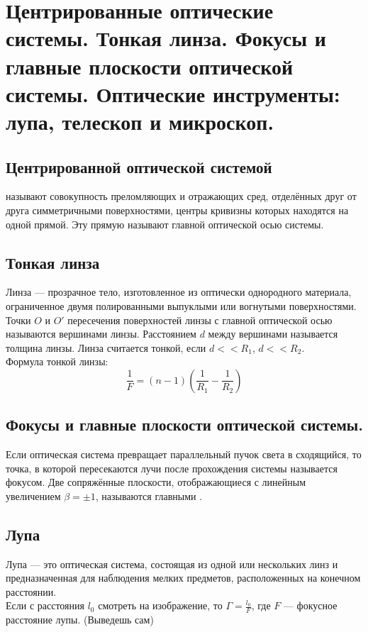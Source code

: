 \section{Центрированные оптические системы. Тонкая линза. Фокусы и главные плоскости оптической системы. Оптические инструменты: лупа, телескоп и микроскоп.}
\subsection*{Центрированной оптической системой}
называют совокупность преломляющих и отражающих сред, отделённых друг от друга симметричными поверхностями, центры кривизны которых находятся на одной прямой. Эту прямую называют главной оптической осью системы.
\subsection*{Тонкая линза}
Линза --- прозрачное тело, изготовленное из оптически однородного материала, ограниченное двумя полированными выпуклыми или вогнутыми поверхностями.\\
Точки $O$ и $O'$ пересечения поверхностей линзы с главной оптической осью называются вершинами линзы. Расстоянием $d$ между вершинами называется толщина линзы. Линза считается тонкой, если $d << R_1$, $d << R_2$.\\
Формула тонкой линзы:
$$\frac{1}{F} = (n - 1) (\frac{1}{R_1} - \frac{1}{R_2})$$
\subsection{Фокусы и главные плоскости оптической системы.}
Если оптическая система превращает параллельный пучок света в сходящийся, то точка, в которой пересекаются лучи после прохождения системы называется фокусом. Две сопряжённые плоскости, отображающиеся с линейным увеличением $\beta =  \pm 1$, называются главными .
\subsection{Лупа}
Лупа --- это оптическая система, состоящая из одной или нескольких линз и предназначенная для наблюдения мелких предметов, расположенных на конечном расстоянии.\\
Если с расстояния $l_0$ смотреть на изображение, то $\Gamma = \frac{l_0}{F}$, где $F$ --- фокусное расстояние лупы. (Выведешь сам)
